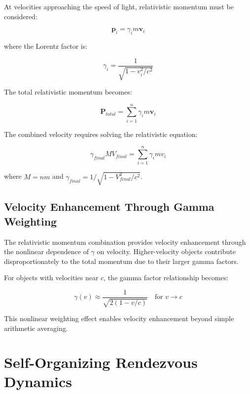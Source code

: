 \documentclass[11pt,a4paper]{article}
\theoremstyle{remark}
\begin{document}
At velocities approaching the speed of light, relativistic momentum must be considered:

\begin{equation}
\mathbf{p}_i = \gamma_i m \mathbf{v}_i
\label{eq:relativistic_momentum}
\end{equation}

where the Lorentz factor is:

\begin{equation}
\gamma_i = \frac{1}{\sqrt{1 - v_i^2/c^2}}
\label{eq:lorentz_factor}
\end{equation}

The total relativistic momentum becomes:

\begin{equation}
\mathbf{P}_{total} = \sum_{i=1}^{n} \gamma_i m \mathbf{v}_i
\label{eq:total_relativistic_momentum}
\end{equation}

The combined velocity requires solving the relativistic equation:

\begin{equation}
\gamma_{final} M V_{final} = \sum_{i=1}^{n} \gamma_i m v_i
\label{eq:relativistic_momentum_conservation}
\end{equation}

where $M = nm$ and $\gamma_{final} = 1/\sqrt{1 - V_{final}^2/c^2}$.

\subsection{Velocity Enhancement Through Gamma Weighting}

The relativistic momentum combination provides velocity enhancement through the nonlinear dependence of $\gamma$ on velocity. Higher-velocity objects contribute disproportionately to the total momentum due to their larger gamma factors.

For objects with velocities near $c$, the gamma factor relationship becomes:

\begin{equation}
\gamma(v) \approx \frac{1}{\sqrt{2(1-v/c)}} \quad \text{for } v \to c
\label{eq:gamma_approximation}
\end{equation}

This nonlinear weighting effect enables velocity enhancement beyond simple arithmetic averaging.

\section{Self-Organizing Rendezvous Dynamics}
\end{document}

